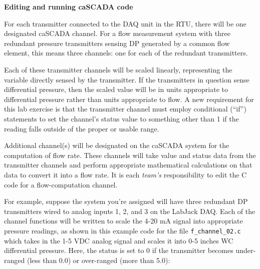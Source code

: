 \vfil \eject

\noindent
{\bf Editing and running caSCADA code}

\vskip 5pt

For each transmitter connected to the DAQ unit in the RTU, there will be one designated caSCADA channel.  For a flow measurement system with three redundant pressure transmitters sensing DP generated by a common flow element, this means three channels: one for each of the redundant transmitters.  

Each of these transmitter channels will be scaled linearly, representing the variable directly sensed by the transmitter.  If the transmitters in question sense differential pressure, then the scaled value will be in units appropriate to differential pressure rather than units appropriate to flow.  A new requirement for this lab exercise is that the transmitter channel must employ conditional (``if'') statements to set the channel's status value to something other than 1 if the reading falls outside of the proper or usable range.

Additional channel(s) will be designated on the caSCADA system for the computation of flow rate.  These channels will take value and status data from the transmitter channels and perform appropriate mathematical calculations on that data to convert it into a flow rate.  It is each {\it team's} responsibility to edit the C code for a flow-computation channel.

\vskip 10pt

For example, suppose the system you're assigned will have three redundant DP transmitters wired to analog inputs 1, 2, and 3 on the LabJack DAQ.  Each of the channel functions will be written to scale the 4-20 mA signal into appropriate pressure readings, as shown in this example code for the file {\tt f\_channel\_02.c} which takes in the 1-5 VDC analog signal and scales it into 0-5 inches WC differential pressure.  Here, the status is set to 0 if the transmitter becomes under-ranged (less than 0.0) or over-ranged (more than 5.0):

\vskip 10pt


